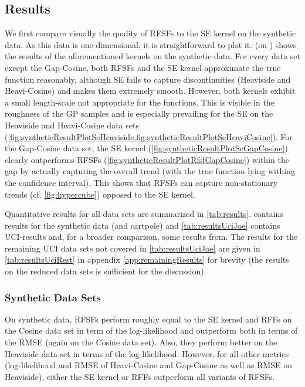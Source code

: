\subsection{Results}  \label{subsec:results}
	We first compare visually the quality of \acp{RFSF} to the \ac{SE} kernel on the synthetic data.
	As this data is one-dimensional, it is straightforward to plot it.
	 (on ) shows the results of the aforementioned kernels on the synthetic data.
	For every data set except the Gap-Cosine, both \acp{RFSF} and the \ac{SE} kernel approximate the true function reasonably, although \ac{SE} fails to capture discontinuities (Heaviside and Heavi-Cosine) and makes them extremely smooth.
	However, both kernels exhibit a small length-scale not appropriate for the functions.
	This is visible in the roughness of the \ac{GP} samples and is especially prevailing for the \ac{SE} on the Heaviside and Heavi-Cosine data sets (\cref{fig:syntheticResultPlotSeHeaviside,fig:syntheticResultPlotSeHeaviCosine}).
	For the Gap-Cosine data set, the \ac{SE} kernel (\cref{fig:syntheticResultPlotSeGapCosine}) clearly outperforms \acp{RFSF} (\cref{fig:syntheticResultPlotRfsfGapCosine}) within the gap by actually capturing the overall trend (with the true function lying withing the confidence interval).
	This shows that \acp{RFSF} can capture non-stationary trends (cf. \cref{fig:hypercube}) opposed to the \ac{SE} kernel.

	Quantitative results for all data sets are summarized in \cref{tab:results}.
	 contains results for the synthetic data (and cartpole) and \cref{tab:resultsUciJoe} contains \ac{UCI}-results and, for a broader comparison, some results from\cite{watsonLatentDerivativeBayesian2021}.
	The results for the remaining \ac{UCI} data sets not covered in \cref{tab:resultsUciJoe} are given in \cref{tab:resultsUciRest} in appendix \cref{app:remainingResults} for brevity (the results on the reduced data sets is sufficient for the discussion).

	\subsubsection{Synthetic Data Sets}
		On synthetic data, \acp{RFSF} perform roughly equal to the \ac{SE} kernel and \acp{RFF} on the Cosine data set in term of the log-likelihood and outperform both in terms of the \ac{RMSE} (again on the Cosine data set).
		Also, they perform better on the Heaviside data set in terms of the log-likelihood.
		However, for all other metrics (log-likelihood and \ac{RMSE} of Heavi-Cosine and Gap-Cosine as well as \ac{RMSE} on Heaviside), either the \ac{SE} kernel or \acp{RFF} outperform all variants of \acp{RFSF}.

